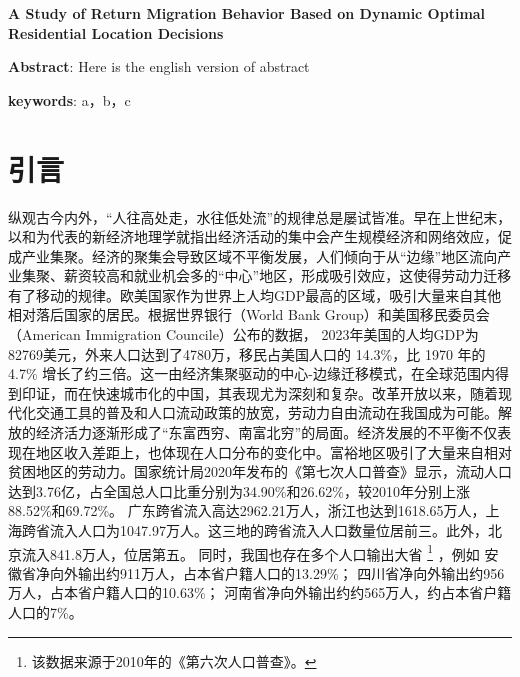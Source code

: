 \documentclass[
  a4paper,
  zihao=-4,
  fontset=mac,
  AutoFakeBold,
  AutoFakeSlant,
  oneside]{ctexbook}
\let\oldfootnote\footnote
\renewcommand{\footnote}[1]{%
  \oldfootnote{\setstretch{1.5}#1}%
}
\begin{document}
\begin{center}
    {
    \textbf{A Study of Return Migration Behavior Based on Dynamic Optimal Residential Location Decisions}
    }
\end{center}

{
\textbf{Abstract}: Here is the english version of abstract

\textbf{keywords}: a，b，c
}



\frontmatter
\renewcommand{\thepage}{\Roman{page}} %

%

\newpage
\tableofcontents
\thispagestyle{empty}

\mainmatter
\newpage
\chapter{引言}

纵观古今内外，“人往高处走，水往低处流”的规律总是屡试皆准。早在上世纪末，以\textcite{krugmanIncreasingReturnsEconomic1991}和\textcite{fujitaSpatialEconomyCities1999}为代表的新经济地理学就指出经济活动的集中会产生规模经济和网络效应，促成产业集聚。经济的聚集会导致区域不平衡发展，人们倾向于从“边缘”地区流向产业集聚、薪资较高和就业机会多的“中心”地区，形成吸引效应，这使得劳动力迁移有了移动的规律。欧美国家作为世界上人均GDP最高的区域，吸引大量来自其他相对落后国家的居民。根据世界银行（World Bank Group）和美国移民委员会（American Immigration Councile）公布的数据，
2023年美国的人均GDP为82769美元，外来人口达到了4780万，移民占美国人口的 14.3\%，比 1970 年的 4.7\% 增长了约三倍。这一由经济集聚驱动的中心-边缘迁移模式，在全球范围内得到印证，而在快速城市化的中国，其表现尤为深刻和复杂。改革开放以来，随着现代化交通工具的普及和人口流动政策的放宽，劳动力自由流动在我国成为可能。解放的经济活力逐渐形成了“东富西穷、南富北穷”的局面。经济发展的不平衡不仅表现在地区收入差距上，也体现在人口分布的变化中。富裕地区吸引了大量来自相对贫困地区的劳动力。国家统计局2020年发布的《第七次人口普查》显示，流动人口达到3.76亿，占全国总人口比重分别为34.90\%和26.62\%，较2010年分别上涨88.52\%和69.72\%。
广东跨省流入高达2962.21万人，浙江也达到1618.65万人，上海跨省流入人口为1047.97万人。这三地的跨省流入人口数量位居前三。此外，北京流入841.8万人，位居第五。
同时，我国也存在多个人口输出大省\footnote{该数据来源于2010年的《第六次人口普查》。}，例如
安徽省净向外输出约911万人，占本省户籍人口的13.29\%；
四川省净向外输出约956 万人，占本省户籍人口的10.63\%；
河南省净向外输出约约565万人，约占本省户籍人口的7\%。
\end{document}
